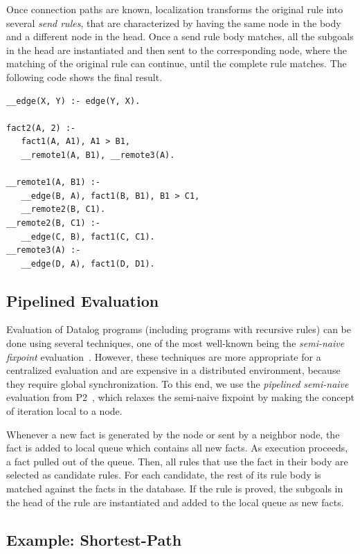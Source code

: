 \documentclass[preprint]{sigplanconf}
\begin{document}
Once connection paths are known, localization transforms the original rule into several
\emph{send rules}, that are characterized by having the same node in the body and a different
node in the head. Once a send rule body matches,
all the subgoals in the head are instantiated and then sent to the corresponding node,
where the matching of the original rule can continue, until the complete rule matches.
The following code shows the final result.

\begin{verbatim}
__edge(X, Y) :- edge(Y, X).

fact2(A, 2) :-
   fact1(A, A1), A1 > B1,
   __remote1(A, B1), __remote3(A).
   
__remote1(A, B1) :-
   __edge(B, A), fact1(B, B1), B1 > C1,
   __remote2(B, C1).
__remote2(B, C1) :-
   __edge(C, B), fact1(C, C1).
__remote3(A) :-
   __edge(D, A), fact1(D, D1).
\end{verbatim}

\subsection{Pipelined Evaluation}

Evaluation of Datalog programs (including programs with recursive rules) can be done using
several techniques, one of the most well-known being the \emph{semi-naive fixpoint}
evaluation~\cite{Balbin1987259, Bancilhon:1986:NER:8789.8804}. However, these techniques
are more appropriate for a centralized evaluation and are expensive in a distributed environment,
because they require global synchronization. To this end, we use the \emph{pipelined semi-naive}
evaluation from P2~\cite{Loo-condie-garofalakis-p2}, which relaxes the semi-naive fixpoint
by making the concept of iteration local to a node.

Whenever a new fact is generated by the node or sent by a neighbor node, the fact is added to local
queue which contains all new facts. As execution proceeds, a fact pulled out of the queue. Then,
all rules that use the fact in their body are selected as candidate rules. For each candidate, the
rest of its rule body is matched against the facts in the database. If the rule is proved, the subgoals
in the head of the rule are instantiated and added to the local queue as new facts.

\subsection{Example: Shortest-Path}
\end{document}
